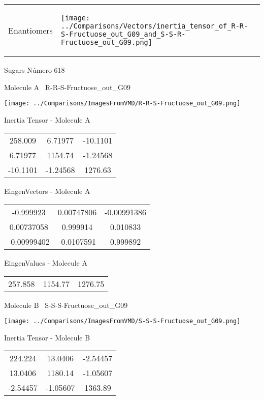 \vtab[-5mm]
\begin{tabular}{*{2}{m{}}}
\begin{center}
\textcolor{NavyBlue}{\Large Enantiomers}
\end{center}
&
\begin{center}
\texttt{[image: ../Comparisons/Vectors/inertia\_tensor\_of\_R-R-S-Fructuose\_out\_G09\_and\_S-S-R-Fructuose\_out\_G09.png]}
\end{center}
\end{tabular}

 \newpage

\vtab[-3cm]
\begin{center}
{\large Sugars \tab Número 618}
\end{center}
\begin{multicols}{2}
\begin{center}

Molecule A \
R-R-S-Fructuose\_out\_G09

\texttt{[image: ../Comparisons/ImagesFromVMD/R-R-S-Fructuose\_out\_G09.png]}

Inertia Tensor - Molecule A \\
\begin{tabular}{|c c c|}
258.009	 & 	6.71977	 & 	-10.1101	 \\
6.71977	 & 	1154.74	 & 	-1.24568	 \\
-10.1101	 & 	-1.24568	 & 	1276.63
\end{tabular}

\vtab
 EingenVectors - Molecule A     \\
\begin{tabular}{|c c c|}
-0.999923	 & 	0.00747806	 & 	-0.00991386	 \\
0.00737058	 & 	0.999914	 & 	0.010833	 \\
-0.00999402	 & 	-0.0107591	 & 	0.999892
\end{tabular}

\vtab
 EingenValues - Molecule A     \\
\begin{tabular}{|c c c|}
257.858	 & 	1154.77	 & 	1276.75	 \\
\end{tabular}
\columnbreak

Molecule B \
S-S-S-Fructuose\_out\_G09

\texttt{[image: ../Comparisons/ImagesFromVMD/S-S-S-Fructuose\_out\_G09.png]}

Inertia Tensor - Molecule B \\
\begin{tabular}{|c c c|}
224.224	 & 	13.0406	 & 	-2.54457	 \\
13.0406	 & 	1180.14	 & 	-1.05607	 \\
-2.54457	 & 	-1.05607	 & 	1363.89
\end{tabular}


\end{center}
\end{multicols}
